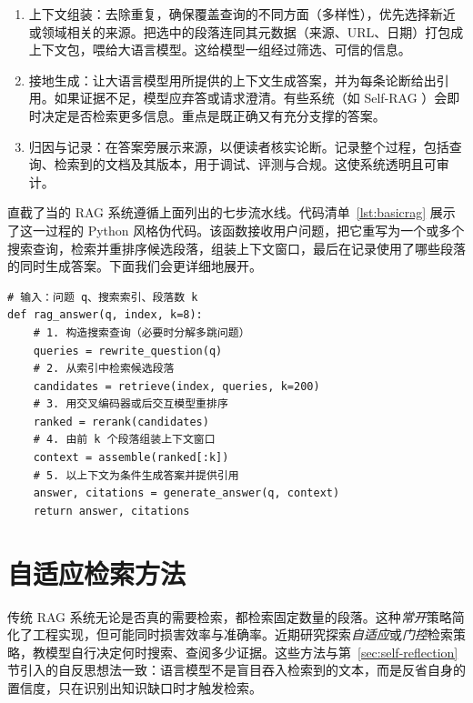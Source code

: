 \begin{enumerate}
\item 上下文组装：去除重复，确保覆盖查询的不同方面（多样性），优先选择新近或领域相关的来源。把选中的段落连同其元数据（来源、URL、日期）打包成上下文包，喂给大语言模型。这给模型一组经过筛选、可信的信息。

\item 接地生成：让大语言模型用所提供的上下文生成答案，并为每条论断给出引用。如果证据不足，模型应弃答或请求澄清。有些系统（如 Self-RAG \citep{asai2023selfrag}）会即时决定是否检索更多信息。重点是既正确又有充分支撑的答案。

\item 归因与记录：在答案旁展示来源，以便读者核实论断。记录整个过程，包括查询、检索到的文档及其版本，用于调试、评测与合规。这使系统透明且可审计。
\end{enumerate}
%
直截了当的 RAG 系统遵循上面列出的七步流水线。代码清单~\ref{lst:basicrag} 展示了这一过程的 Python 风格伪代码。该函数接收用户问题，把它重写为一个或多个搜索查询，检索并重排序候选段落，组装上下文窗口，最后在记录使用了哪些段落的同时生成答案。下面我们会更详细地展开。

\begin{listing}[!ht]
\begin{verbatim}
# 输入：问题 q、搜索索引、段落数 k
def rag_answer(q, index, k=8):
    # 1. 构造搜索查询（必要时分解多跳问题）
    queries = rewrite_question(q)
    # 2. 从索引中检索候选段落
    candidates = retrieve(index, queries, k=200)
    # 3. 用交叉编码器或后交互模型重排序
    ranked = rerank(candidates)
    # 4. 由前 k 个段落组装上下文窗口
    context = assemble(ranked[:k])
    # 5. 以上下文为条件生成答案并提供引用
    answer, citations = generate_answer(q, context)
    return answer, citations
\end{verbatim}
\caption{基本 RAG 设置的高层流程}
\label{lst:basicrag}
\end{listing}

\section{自适应检索方法}\label{sec:adaptive}
传统 RAG 系统无论是否真的需要检索，都检索固定数量的段落。这种{\em 常开}策略简化了工程实现，但可能同时损害效率与准确率。近期研究探索\emph{自适应}或\emph{门控}检索策略，教模型自行决定何时搜索、查阅多少证据。这些方法与第~\ref{sec:self-reflection} 节引入的自反思想法一致：语言模型不是盲目吞入检索到的文本，而是反省自身的置信度，只在识别出知识缺口时才触发检索。

